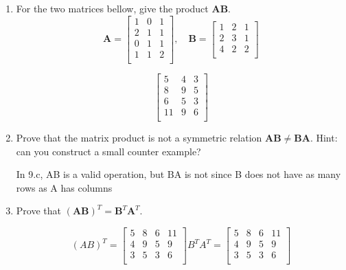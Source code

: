 \documentclass{homework}
\begin{document}
\begin{enumerate}[label=(\alph*)]
  \item For the two matrices bellow, give the product $\mathbf{AB}$.
        \[
          \mathbf{A} = \begin{bmatrix} 1 & 0 & 1 \\   2 & 1 & 1 \\   0 & 1 & 1 \\   1 & 1 & 2 \\   \end{bmatrix}, \quad
          \mathbf{B} = \begin{bmatrix} 1 & 2 & 1 \\   2 & 3 & 1 \\   4 & 2 & 2 \\   \end{bmatrix}
        \]
        \begin{sol}
          \[
          \begin{bmatrix}
            5 & 4 & 3 \\
            8 & 9 & 5 \\
            6 & 5 & 3 \\
            11 & 9 & 6 \\
          \end{bmatrix}
          \]
        \end{sol}
  \item Prove that the matrix product is not a symmetric relation \ie
        $\mathbf{AB} \neq \mathbf{BA}$. Hint: can you construct a small
        counter example?
        \begin{sol}
          In 9.c, AB is a valid operation, but BA is not since B does not have as many rows as A has columns
        \end{sol}
  \item Prove that $\mathbf{(AB)}^T = \mathbf{B}^T\mathbf{A}^T$.
    \begin{sol}
      \[
        (AB)^T = 
        \begin{bmatrix}
          5 & 8 & 6 & 11 \\ 
          4 & 9 & 5 & 9 \\ 
          3 & 5 & 3 & 6 \\ 
        \end{bmatrix}
        B^T A^T =
        \begin{bmatrix}
          5 & 8 & 6 & 11 \\ 
          4 & 9 & 5 & 9 \\ 
          3 & 5 & 3 & 6 \\ 
        \end{bmatrix}
      \]
    \end{sol}


\end{enumerate}
\end{document}
